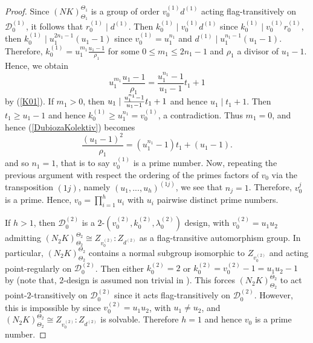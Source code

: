 \documentclass[a4paper,twopage,reqno,12pt]{amsart}
\theoremstyle{definition}
\numberwithin{equation}{section}
\renewcommand{\leq}{\leqslant}
\renewcommand{\geq}{\geqslant}
\begin{document}
\begin{proof}
Since $(NK)_{\Theta _{1}}^{\Theta _{1}}$ is a group of order $v_{0}^{(1)}d^{(1)}$ acting flag-transitively on $\mathcal{D}_{0}^{(1)} $, it follows that $r_{0}^{(1)} \mid d^{(1)}$. Then $k_{0}^{(1)}\mid v_{0}^{(1)}d^{(1)}$ since $k_{0}^{(1)}\mid v_{0}^{(1)}r_{0}^{(1)}$, then $%
k_{0}^{(1)}\mid u_{1}^{2n_{1}-1}(u_{1}-1)$ since $v_{0}^{(1)}=u_{1}^{n_{1}}$
and $d^{(1)}\mid u_{1}^{n_{1}-1}(u_{1}-1)$. Therefore, $%
k_{0}^{(1)}=u_{1}^{m_{1}}\frac{u_{1}-1}{\rho _{1}}$ for some $0\leq
m_{1}\leq 2n_{1}-1$ and $\rho _{1} $ a divisor of $u_{1}-1$. Hence, we obtain
\begin{equation}\label{DubiozaKolektiv}
u_{1}^{m_{1}}\frac{u_{1}-1}{\rho _{1}}=\frac{u_{1}^{n_{1}}-1}{u_{1}-1}%
t_{1}+1 
\end{equation}%
by (\ref{K01}). If $m_{1}>0$, then $u_{1}\mid \frac{u_{1}^{n_{1}}-1}{%
u_{1}-1}t_{1}+1$ and hence $u_{1}\mid t_{1}+1$. Then $t_{1}\geq u_{1}-1$ and
hence $k_{0}^{(1)}\geq u_{1}^{n_{1}}=v_{0}^{(1)}$, a contradiction. Thus $%
m_{1}=0$, and hence (\ref{DubiozaKolektiv}) becomes
\[
\frac{\left( u_{1}-1\right) ^{2}}{\rho _{1}}=\left( u_{1}^{n_{1}}-1\right)
t_{1}+\left( u_{1}-1\right) \text{.} 
\]%
and so $n_{1}=1$, that is to say $v_{0}^{(1)}$ is a prime number. Now, repeating the
previous argument with respect the ordering of the primes factors of $%
v_{0}$ via the transposition $(1j)$, namely $\left( u_{1},...,u_{h}\right)
^{(1j)}$, we see that $n_{j}=1$. Therefore, $v_{0}^{j}$ is a prime. Hence, $v_{0}=\prod_{i=1}^{h}u_{i}$ with $u_{i}$ pairwise distinct prime numbers.

If $h>1$, then $\mathcal{D}_{0}^{(2)}$ is a $2$-$%
(v_{0}^{(2)},k_{0}^{(2)},\lambda _{0}^{(2)})$ design, with $%
v_{0}^{(2)}=u_{1}u_{2}$ admitting $(N_{2}K)_{\Theta _{2}}^{\Theta _{2}}\cong Z_{v_{0}^{(2)}}:Z_{d^{(2)}}$ as a
flag-transitive automorphism group. In particular, $(N_{2}K)_{\Theta _{2}}^{\Theta _{2}}$ contains a normal subgroup isomorphic to $ Z_{v_{0}^{(2)}}$ and acting point-regularly on $\mathcal{D}_{0}^{(2)}$. Then either $k_{0}^{(2)}=2$ or $k_{0}^{(2)}=v_{0}^{(2)}-1=u_{1}u_{2}-1$ by \cite[Theorem 3.6]{CZ} (note that, $2$-design is assumed non
trivial in \cite[Theorem 3.6]{CZ}). This forces $(N_{2}K)_{\Theta _{2}}^{\Theta _{2}}$ to act point-$2$-transitively on $\mathcal{D}_{0}^{(2)}$ since it acts flag-transitively on $\mathcal{D}_{0}^{(2)}$. However, this is impossible by \cite[Theorem 4.1B]{DM} since $%
v_{0}^{(2)}=u_{1}u_{2}$, with $u_{1}\neq u_{2}$, and $(N_{2}K)_{\Theta _{2}}^{\Theta _{2}}\cong Z_{v_{0}^{(2)}}:Z_{d^{(2)}}$ is solvable. Therefore $h=1$ and hence $v_{0}$ is
a prime number. 


\end{proof}
\end{document}
